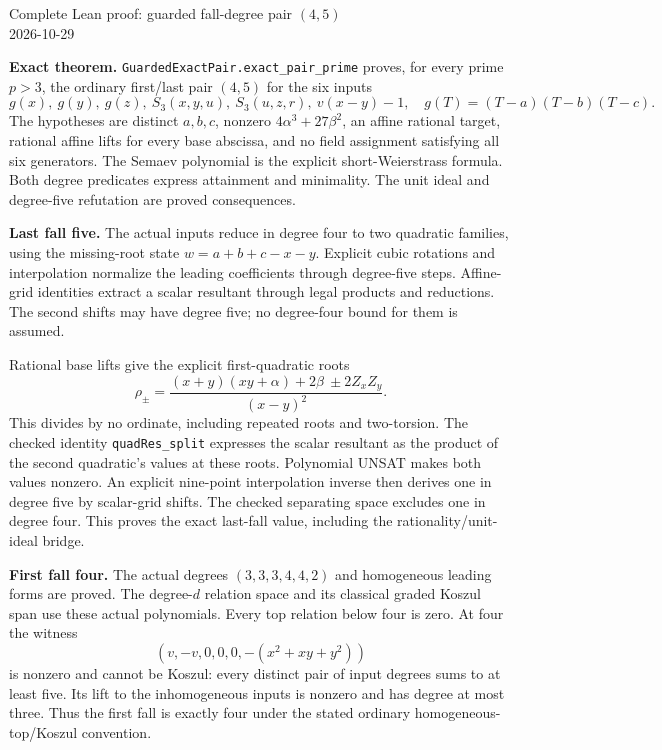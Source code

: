 \documentclass[10pt]{article}
\begin{document}
\raggedright
\begin{center}{\Large Complete Lean proof: guarded fall-degree pair $(4,5)$}\\2026-10-29\end{center}

\textbf{Exact theorem.} \texttt{GuardedExactPair.exact\_pair\_prime} proves,
for every prime $p>3$, the ordinary first/last pair $(4,5)$ for the six inputs
\[
g(x),\ g(y),\ g(z),\ S_3(x,y,u),\ S_3(u,z,r),\ v(x-y)-1,
\quad g(T)=(T-a)(T-b)(T-c).
\]
The hypotheses are distinct $a,b,c$, nonzero $4\alpha^3+27\beta^2$, an
affine rational target, rational affine lifts for every base abscissa, and
no field assignment satisfying all six generators. The Semaev polynomial is
the explicit short-Weierstrass formula. Both degree predicates express
attainment and minimality. The unit ideal and degree-five refutation are
proved consequences.

\textbf{Last fall five.} The actual inputs reduce in degree four to two
quadratic families, using the missing-root state $w=a+b+c-x-y$.
Explicit cubic rotations and interpolation normalize the leading coefficients
through degree-five steps. Affine-grid identities extract a scalar resultant
through legal products and reductions. The second shifts may have degree
five; no degree-four bound for them is assumed.

Rational base lifts give the explicit first-quadratic roots
\[
\rho_\pm=\frac{(x+y)(xy+\alpha)+2\beta\ \pm2Z_xZ_y}{(x-y)^2}.
\]
This divides by no ordinate, including repeated roots and two-torsion.
The checked identity \texttt{quadRes\_split} expresses the scalar resultant
as the product of the second quadratic's values at these roots. Polynomial
UNSAT makes both values nonzero. An explicit nine-point interpolation inverse
then derives one in degree five by scalar-grid shifts. The checked separating
space excludes one in degree four. This proves the exact last-fall value,
including the rationality/unit-ideal bridge.

\textbf{First fall four.} The actual degrees $(3,3,3,4,4,2)$ and homogeneous
leading forms are proved. The degree-$d$ relation space and its classical
graded Koszul span use these actual polynomials. Every top relation below
four is zero. At four the witness
\[
(v,-v,0,0,0,-(x^2+xy+y^2))
\]
is nonzero and cannot be Koszul: every distinct pair of input degrees sums
to at least five. Its lift to the inhomogeneous inputs is nonzero and has
degree at most three. Thus the first fall is exactly four under the stated
ordinary homogeneous-top/Koszul convention.
\end{document}
